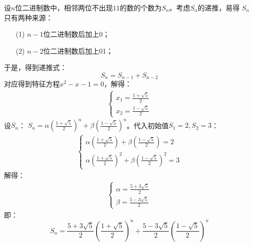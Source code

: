 \begin{solution}
    设$n$位二进制数中，相邻两位不出现$11$的数的个数为$S_n$。考虑$S_n$的递推，易得
    $S_n$只有两种来源：
    \begin{enumerate}
        \item[(1)] $n-1$位二进制数后加上0；
        \item[(2)] $n-2$位二进制数后加上01；
    \end{enumerate}
    于是，得到递推式：
    $$S_n=S_{n-1}+S_{n-2}$$
    对应得到特征方程$x^2-x-1=0$，解得：
    \begin{align*}
        \begin{cases}
            x_1 = \frac{1+\sqrt{5}}{2}\\
            x_2 = \frac{1-\sqrt{5}}{2}
        \end{cases}
    \end{align*}
    设$S_n$：
    $S_n = \alpha (\frac{1+\sqrt{5}}{2})^n+\beta (\frac{1-\sqrt{5}}{2})^n$。代入初始值$S_1=2,S_2=3$：
    \begin{align*}
        \begin{cases}
            \alpha (\frac{1+\sqrt{5}}{2}) +\beta (\frac{1-\sqrt{5}}{2}) = 2\\
            \alpha (\frac{1+\sqrt{5}}{2})^2 +\beta (\frac{1-\sqrt{5}}{2})^2 = 3
        \end{cases}
    \end{align*}
    解得：
    \begin{align*}
        \begin{cases}
            \alpha = \frac{5+3\sqrt{5}}{2}\\
            \beta = \frac{5-3\sqrt{5}}{2}
        \end{cases}
    \end{align*}
    即：
    $$S_n = \frac{5+3\sqrt{5}}{2} \left(\frac{1+\sqrt{5}}{2}\right)^n+\frac{5-3\sqrt{5}}{2} \left(\frac{1-\sqrt{5}}{2}\right)^n$$
\end{solution}